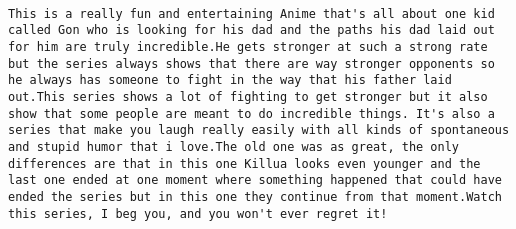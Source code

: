 \documentclass[
]{article}
\begin{document}
\begin{verbatim}
                                                                                                                                                                                                                                                                                                                                                                                                                                                                                                                                                                                                                                                                                                                                                                                                                                               This is a really fun and entertaining Anime that's all about one kid called Gon who is looking for his dad and the paths his dad laid out for him are truly incredible.He gets stronger at such a strong rate but the series always shows that there are way stronger opponents so he always has someone to fight in the way that his father laid out.This series shows a lot of fighting to get stronger but it also show that some people are meant to do incredible things. It's also a series that make you laugh really easily with all kinds of spontaneous and stupid humor that i love.The old one was as great, the only differences are that in this one Killua looks even younger and the last one ended at one moment where something happened that could have ended the series but in this one they continue from that moment.Watch this series, I beg you, and you won't ever regret it!

\end{verbatim}
\end{document}

